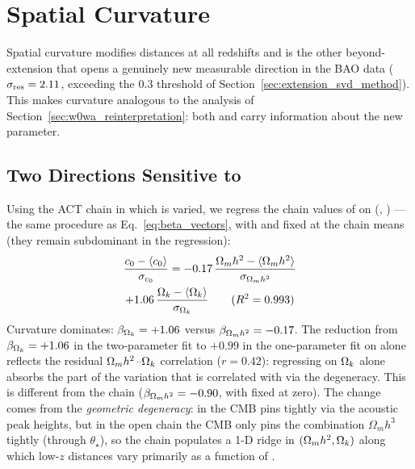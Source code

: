 
\section{Spatial Curvature}
\label{sec:curvature}

Spatial curvature modifies distances at all redshifts and is the other beyond-\LCDM extension that opens a genuinely new measurable direction in the BAO data ($\sigma_{\mathrm{res}} = 2.11$, exceeding the $0.3$ threshold of Section~\ref{sec:extension_svd_method}). This makes curvature analogous to the \wowa analysis of Section~\ref{sec:w0wa_reinterpretation}: both \czero and \cone carry information about the new parameter.

\subsection{Two Directions Sensitive to \Omk}

Using the ACT chain in which \Omk is varied, we regress the chain values of \czero on (\omh, \Omk) --- the same procedure as Eq.~\ref{eq:beta_vectors}, with \obh and \thetastar fixed at the chain means (they remain subdominant in the regression):
\begin{multline}
\frac{c_0 - \langle c_0 \rangle}{\sigma_{c_0}} = -0.17\, \frac{\Omega_m h^2 - \langle \Omega_m h^2 \rangle}{\sigma_{\Omega_m h^2}} \\
+ 1.06\, \frac{\Omega_k - \langle \Omega_k \rangle}{\sigma_{\Omega_k}}
\qquad (R^2 = 0.993)
\label{eq:c0_omk_fit}
\end{multline}
Curvature dominates: $\beta_{\Omega_k} = +1.06$ versus $\beta_{\Omega_m h^2} = -0.17$. The reduction from $\beta_{\Omega_k} = +1.06$ in the two-parameter fit to $+0.99$ in the one-parameter fit on \Omk alone reflects the residual $\Omega_m h^2$--$\Omega_k$ correlation ($r = 0.42$): regressing on $\Omega_k$ alone absorbs the part of the \omh variation that is correlated with \Omk via the degeneracy. This is different from the \LCDM chain ($\beta_{\Omega_m h^2} = -0.90$, with \Omk fixed at zero). The change comes from the \emph{geometric degeneracy}: in \LCDM the CMB pins \omh tightly via the acoustic peak heights, but in the open chain the CMB only pins the combination $\Omega_m h^3$ tightly (through $\theta_\star$), so the chain populates a 1-D ridge in $(\Omega_m h^2, \Omega_k)$ along which low-$z$ distances vary primarily as a function of \Omk.

